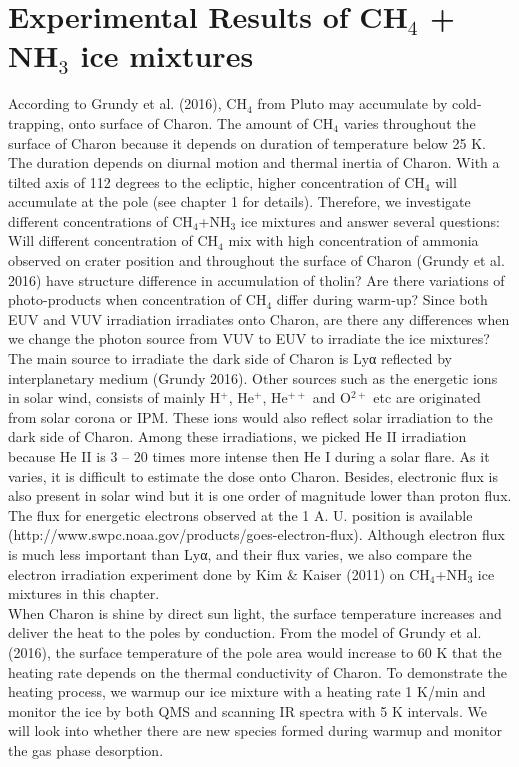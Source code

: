 \chapter{\protect Experimental Results of CH$_4$ + NH$_3$ ice mixtures}
According to Grundy et al. (2016), CH$_4$ from Pluto may accumulate by cold-trapping, onto surface of Charon. The amount of CH$_4$ varies throughout the surface of Charon because it depends on duration of temperature below 25 K. The duration depends on diurnal motion and thermal inertia of Charon. With a tilted axis of 112 degrees to the ecliptic, higher concentration of CH$_4$ will accumulate at the pole (see chapter 1 for details). Therefore, we investigate different concentrations of CH$_4$+NH$_3$ ice mixtures and answer several questions: Will different concentration of CH$_4$ mix with high concentration of ammonia observed on crater position and throughout the surface of Charon (Grundy et al. 2016) have structure difference in accumulation of tholin? Are there variations of photo-products when concentration of CH$_4$ differ during warm-up? Since both EUV and VUV irradiation irradiates onto Charon, are there any differences when we change the photon source from VUV to EUV to irradiate the ice mixtures?\\

The main source to irradiate the dark side of Charon is Lyα reflected by interplanetary medium (Grundy 2016). Other sources such as the energetic ions in solar wind, consists of mainly H$^+$, He$^+$, He$^{++}$ and O$^{2+}$ etc are originated from solar corona or IPM. These ions would also reflect solar irradiation to the dark side of Charon. Among these irradiations, we picked He II irradiation because He II is 3 – 20 times more intense then He I during a solar flare. As it varies, it is difficult to estimate the dose onto Charon. Besides, electronic flux is also present in solar wind but it is one order of magnitude lower than proton flux. The flux for energetic electrons observed at the 1 A. U. position is available (http://www.swpc.noaa.gov/products/goes-electron-flux). Although electron flux is much less important than Lyα, and their flux varies, we also compare the electron irradiation experiment done by Kim & Kaiser (2011) on CH$_4$+NH$_3$ ice mixtures in this chapter. \\

When Charon is shine by direct sun light, the surface temperature increases and deliver the heat to the poles by conduction. From the model of Grundy et al. (2016), the surface temperature of the pole area would increase to 60 K that the heating rate depends on the thermal conductivity of Charon. To demonstrate the heating process, we warmup our ice mixture with a heating rate 1 K/min and monitor the ice by both QMS and scanning IR spectra with 5 K intervals. We will look into whether there are new species formed during warmup and monitor the gas phase desorption.\\

